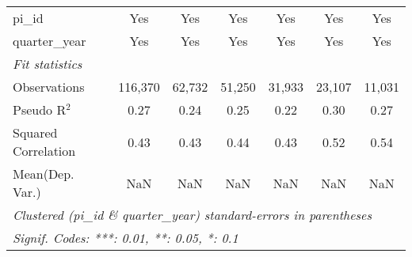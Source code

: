\begin{tabular}{lcccccc}
   pi\_id                                                     & Yes           & Yes           & Yes            & Yes           & Yes           & Yes\\  
   quarter\_year                                              & Yes           & Yes           & Yes            & Yes           & Yes           & Yes\\  
   \midrule
   \emph{Fit statistics}\\
   Observations                                               & 116,370       & 62,732        & 51,250         & 31,933        & 23,107        & 11,031\\  
   Pseudo R$^2$                                               & 0.27          & 0.24          & 0.25           & 0.22          & 0.30          & 0.27\\  
   Squared Correlation                                        & 0.43          & 0.43          & 0.44           & 0.43          & 0.52          & 0.54\\  
Mean(Dep. Var.) & NaN & NaN & NaN & NaN & NaN & NaN \\
   \midrule \midrule
   \multicolumn{7}{l}{\emph{Clustered (pi\_id \& quarter\_year) standard-errors in parentheses}}\\
   \multicolumn{7}{l}{\emph{Signif. Codes: ***: 0.01, **: 0.05, *: 0.1}}\\
\end{tabular}
\par\endgroup
